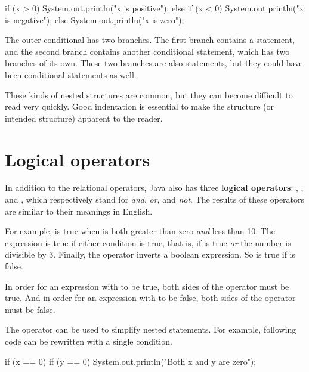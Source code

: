 \begin{code}
if (x > 0) {
    System.out.println("x is positive");
} else {
    if (x < 0) {
        System.out.println("x is negative");
    } else {
        System.out.println("x is zero");
    }
}
\end{code}

The outer conditional has two branches.
The first branch contains a  statement, and the second branch contains another conditional statement, which has two branches of its own.
These two branches are also  statements, but they could have been conditional statements as well.


These kinds of nested structures are common, but they can become difficult to read very quickly.
Good indentation is essential to make the structure (or intended structure) apparent to the reader.


\section{Logical operators}


In addition to the relational operators, Java also has three {\bf logical operators}: \java{&&}, \java{||}, and \java{!}, which respectively stand for {\em and}, {\em or}, and {\em not}.
The results of these operators are similar to their meanings in English.

For example,  is true when  is both greater than zero {\em and} less than 10.
The expression  is true if either condition is true, that is, if  is true {\em or} the number  is divisible by 3.
Finally, the \java{!} operator inverts a boolean expression.
So  is true if  is false.

In order for an expression with \java{&&} to be true, both sides of the \java{&&} operator must be true.
And in order for an expression with \java{||} to be false, both sides of the \java{||} operator must be false.

The \java{&&} operator can be used to simplify nested  statements.
For example, following code can be rewritten with a single condition.

\begin{code}
if (x == 0) {
    if (y == 0) {
        System.out.println("Both x and y are zero");
    }
}
\end{code}

